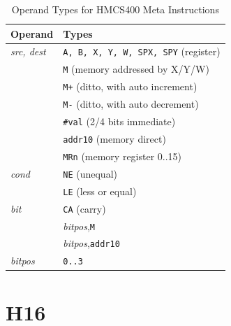 \documentclass[12pt,twoside]{report}
\newcommand{\tty}[1]{{\tt #1}}
\begin{document}
\begin{table}
\begin{center}\begin{tabular}{|l|l|}
\hline
Operand                 & Types \\
\hline
{\em src, dest}         & \tty{A, B, X, Y, W, SPX, SPY} (register) \\
                        & \tty{M} (memory addressed by X/Y/W) \\
                        & \tty{M+} (ditto, with auto increment) \\
                        & \tty{M-} (ditto, with auto decrement) \\
                        & \tty{\#val} (2/4 bits immediate) \\
                        & \tty{addr10} (memory direct) \\
                        & \tty{MRn} (memory register 0..15) \\
{\em cond}              & \tty{NE} (unequal) \\
                        & \tty{LE} (less or equal) \\
{\em bit}               & \tty{CA} (carry) \\
                        & {\em bitpos},\tty{M} \\
                        & {\em bitpos},\tty{addr10} \\
{\em bitpos}            & \tty{0..3} \\
\hline
\end{tabular}\end{center}
\caption{Operand Types for HMCS400 Meta Instructions}
\label{TabHMCS400MetaOps}
\end{table}


\section{H16}
\end{document}
